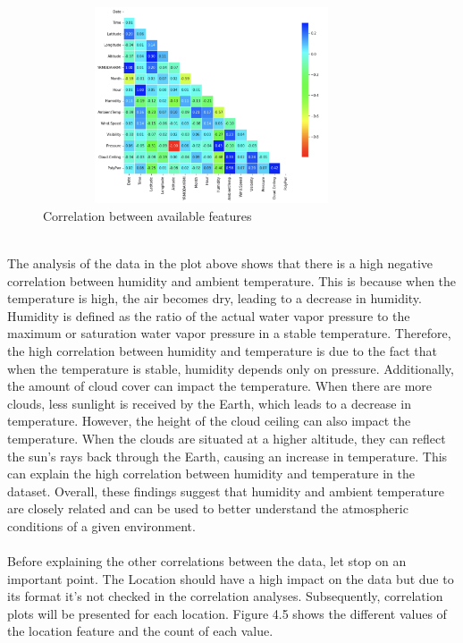 \documentclass{report}
\begin{document}
\begin{figure}[h!]
  \centering
    \includegraphics[width=10cm, height=5.8cm] {corr.png}
    \caption{Correlation between available features}
    \label{fig:my_label}
\end{figure}
\hfill \break 
\\
The analysis of the data in the plot above shows that there is a high negative correlation between humidity and ambient temperature. This is because when the temperature is high, the air becomes dry, leading to a decrease in humidity. Humidity is defined as the ratio of the actual water vapor pressure to the maximum or saturation water vapor pressure in a stable temperature. Therefore, the high correlation between humidity and temperature is due to the fact that when the temperature is stable, humidity depends only on pressure. Additionally, the amount of cloud cover can impact the temperature. When there are more clouds, less sunlight is received by the Earth, which leads to a decrease in temperature. However, the height of the cloud ceiling can also impact the temperature. When the clouds are situated at a higher altitude, they can reflect the sun's rays back through the Earth, causing an increase in temperature. This can explain the high correlation between humidity and temperature in the dataset. Overall, these findings suggest that humidity and ambient temperature are closely related and can be used to better understand the atmospheric conditions of a given environment.\\
\\
Before explaining the other correlations between the data, let stop on an important point. The Location should have a high impact on the data but due to its format it's not checked in the correlation analyses. Subsequently, correlation plots will be presented for each location. Figure 4.5 shows the different values of the location feature and the count of each value.
\end{document}

